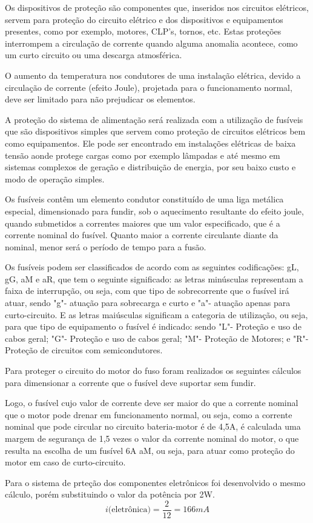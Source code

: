 \par Os dispositivos de proteção são componentes que, inseridos nos circuitos elétricos, servem para proteção do circuito elétrico e dos dispositivos e equipamentos presentes, como por exemplo, motores, CLP’s, tornos, etc. Estas proteções interrompem a circulação de corrente quando alguma anomalia acontece, como um curto circuito ou uma descarga atmosférica.
\par O aumento da temperatura nos condutores de uma instalação elétrica, devido a circulação de corrente (efeito Joule), projetada para o funcionamento normal, deve ser limitado para não prejudicar os elementos.
\par A proteção do sistema de alimentação será realizada com a utilização de fusíveis que são dispositivos simples que servem como proteção de circuitos elétricos bem como equipamentos. Ele pode ser encontrado em instalações elétricas de baixa tensão aonde protege cargas como por exemplo lâmpadas e até mesmo em sistemas complexos de geração e distribuição de energia, por seu baixo custo e modo de operação simples.
\par Os fusíveis contêm um elemento condutor constituído de uma liga metálica especial, dimensionado para fundir, sob o aquecimento resultante do efeito joule, quando submetidos a correntes maiores que um valor especificado, que é a corrente nominal do fusível. Quanto maior a corrente circulante diante da nominal, menor será o período de tempo para a fusão.
\par Os fusíveis podem ser classificados de acordo com as seguintes codificações: gL, gG, aM e aR, que tem o seguinte significado: as letras minúsculas representam a faixa de interrupção, ou seja, com que tipo de sobrecorrente que o fusível irá atuar, sendo "g"- atuação para sobrecarga e curto e "a"- atuação apenas para curto-circuito. E as letras maiúsculas significam a categoria de utilização, ou seja, para que tipo de equipamento o fusível é indicado: sendo "L"- Proteção e uso de cabos geral; "G"- Proteção e uso de cabos geral; "M"- Proteção de Motores; e "R"- Proteção de circuitos com semicondutores.
\par Para proteger o circuito do motor do fuso foram realizados os seguintes cálculos para dimensionar a corrente que o fusível deve suportar sem fundir.

\par Logo, o fusível cujo valor de corrente deve ser maior do que a corrente nominal que o motor pode drenar em funcionamento normal, ou seja, como a corrente nominal que pode circular no circuito bateria-motor é de 4,5A,  é calculada uma margem de segurança de 1,5 vezes o valor da corrente nominal do motor, o que resulta na escolha de um fusível 6A aM, ou seja, para atuar como proteção do motor em caso de curto-circuito.
\par Para o sistema de prteção dos componentes eletrônicos foi desenvolvido o mesmo cálculo, porém substituindo o valor da potência por 2W.
\begin{equation}
i\text{(eletrônica)}=\frac{2}{12} =166 mA
\end{equation}

